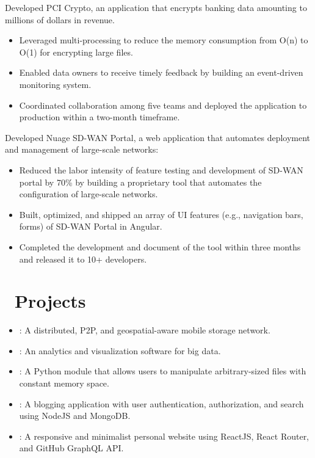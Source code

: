 \documentclass{resume}
\begin{document}
Developed PCI Crypto, an application that encrypts banking data amounting to millions of dollars in revenue.
\begin{itemize}
  \item {Leveraged multi-processing to reduce the memory consumption from O(n) to O(1) for encrypting large files.}
  \item {Enabled data owners to receive timely feedback by building an event-driven monitoring system.}
  \item {Coordinated collaboration among five teams and deployed the application to production within a two-month timeframe.}
\end{itemize}

Developed Nuage SD-WAN Portal, a web application that automates deployment and management of large-scale networks:
\begin{itemize}
  \item {Reduced the labor intensity of feature testing and development of SD-WAN portal by 70\%
        by building a proprietary tool that automates the configuration of large-scale networks.}
  \item {Built, optimized, and shipped an array of UI features (e.g., navigation bars, forms) of SD-WAN Portal in Angular.}
  \item {Completed the development and document of the tool within three months and released it to 10+ developers.}
\end{itemize}

\section{\faCodeFork\ Projects}
\begin{itemize}[parsep=0.5ex]
  \item {}: A distributed, P2P, and geospatial-aware mobile storage network.
  \item {}: An analytics and visualization software for big data.
  \item {}: A Python module that allows users to manipulate arbitrary-sized files with constant memory space.
  \item {}: A blogging application with user authentication, authorization, and search using NodeJS and MongoDB.
  \item {}: A responsive and minimalist personal website using ReactJS, React Router, and GitHub GraphQL API.
\end{itemize}
\end{document}
